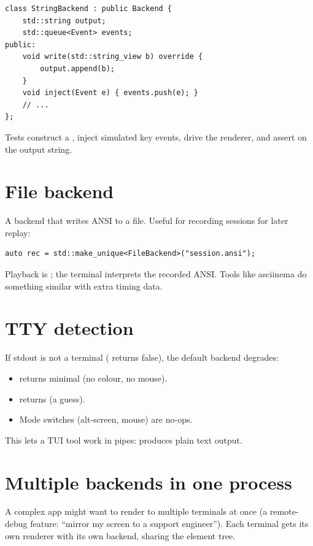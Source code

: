 \begin{lstlisting}
class StringBackend : public Backend {
    std::string output;
    std::queue<Event> events;
public:
    void write(std::string_view b) override {
        output.append(b);
    }
    void inject(Event e) { events.push(e); }
    // ...
};
\end{lstlisting}

Tests construct a , inject simulated key
events, drive the renderer, and assert on the output string.

\section{File backend}

A backend that writes ANSI to a file. Useful for recording
sessions for later replay:

\begin{lstlisting}
auto rec = std::make_unique<FileBackend>("session.ansi");
\end{lstlisting}

Playback is ; the terminal interprets
the recorded ANSI. Tools like asciinema do something similar
with extra timing data.

\section{TTY detection}

If stdout is not a terminal ( returns false), the
default backend degrades:

\begin{itemize}[leftmargin=*]
  \item {} returns minimal (no colour, no mouse).
  \item {} returns  (a guess).
  \item Mode switches (alt-screen, mouse) are no-ops.
\end{itemize}

This lets a TUI tool work in pipes:
 produces plain text output.

\section{Multiple backends in one process}

A complex app might want to render to multiple terminals at
once (a remote-debug feature: ``mirror my screen to a
support engineer''). Each terminal gets its own renderer with
its own backend, sharing the element tree.

